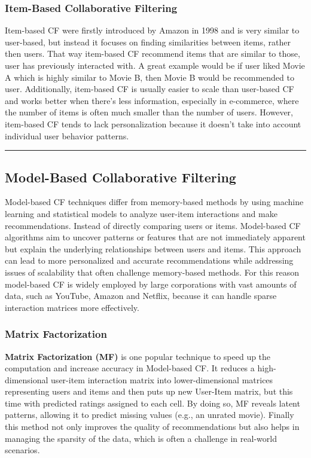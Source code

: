 \documentclass[10pt,a4paper]{article}
\begin{document}
\subsubsection{Item-Based Collaborative Filtering}
Item-based CF were firstly introduced by Amazon in 1998 and is very similar to user-based, but instead it focuses on finding similarities between items, rather then users. That way item-based CF recommend items that are similar to those, user has previously interacted with. A great example would be if user liked Movie A which is highly similar to Movie B, then Movie B would be recommended to user. Additionally, item-based CF is usually easier to scale than user-based CF and works better when there's less information, especially in e-commerce, where the number of items is often much smaller than the number of users. However, item-based CF tends to lack personalization because it doesn’t take into account individual user behavior patterns. \cite{8506344}

\hspace{0.1cm}
\hrule
\hspace{0.1cm}

\subsection{Model-Based Collaborative Filtering}
Model-based CF techniques differ from memory-based methods by using machine learning and statistical models to analyze user-item interactions and make recommendations. Instead of directly comparing users or items. Model-based CF algorithms aim to uncover patterns or features that are not immediately apparent but explain the underlying relationships between users and items. This approach can lead to more personalized and accurate recommendations while addressing issues of scalability that often challenge memory-based methods. For this reason model-based CF is widely employed by large corporations with vast amounts of data, such as YouTube, Amazon and Netflix, because it can handle sparse interaction matrices more effectively.

\hspace{0.1cm}

\subsubsection{Matrix Factorization}
\label{sec:matrix-factorization}
\textbf{Matrix Factorization (MF)} is one popular technique to speed up the computation and increase accuracy in Model-based CF. It reduces a high-dimensional user-item interaction matrix into lower-dimensional matrices representing users and items and then puts up new User-Item matrix, but this time with predicted ratings assigned to each cell. By doing so, MF reveals latent patterns, allowing it to predict missing values (e.g., an unrated movie). Finally this method not only improves the quality of recommendations but also helps in managing the sparsity of the data, which is often a challenge in real-world scenarios.
\cite{matrixfactorization} \cite{koren2009matrix}
\end{document}
